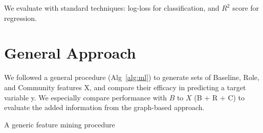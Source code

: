 \documentclass[letterpaper, 12pt, conference]{ieeeconf}
\begin{document}
We evaluate with standard techniques: log-loss for classification, and $R^2$ score for regression.

\section{General Approach}

We followed a general procedure (Alg~\ref{alg:ml}) to generate sets of Baseline, Role, and Community features X, and compare their efficacy in predicting a target variable y. 
We especially compare performance with $B$ to $X$ (B + R + C) to evaluate the added information from the graph-based approach.

\begin{algorithm}[ht]
    \label{alg:ml}
    \caption{A generic feature mining procedure}
    \SetAlgoLined\SetArgSty{}
\end{algorithm}
\end{document}
